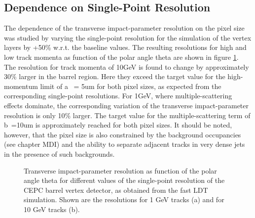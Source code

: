 \subsection{Dependence on Single-Point Resolution}

The dependence of the transverse impact-parameter resolution on the pixel size was studied by varying the single-point resolution for the simulation of the vertex layers by +50\% w.r.t. the baseline values. The resulting resolutions for high and low track momenta as function of the polar angle theta are shown in figure \ref{fig:res}. The resolution for track momenta of 10GeV is found to change by approximately 30\% larger in the barrel region. Here they exceed the target value for the high-momentum limit of a ~= 5um for both pixel sizes, as expected from the corresponding single-point resolutions. For 1GeV, where multiple-scattering effects dominate, the corresponding variation of the transverse impact-parameter resolution is only 10\% larger. The target value for the multiple-scattering term of b~=10um is approximately reached for both pixel sizes. It should be noted, however, that the pixel size is also constrained by the background occupancies (see chapter MDI) and the ability to separate adjacent tracks in very dense jets in the presence of such backgrounds.
\begin{figure}[h!]
	\centering
	\caption{Transverse impact-parameter resolution as function of the polar angle theta for different values of the single-point resolution of the CEPC barrel vertex detector, as obtained from the fast LDT simulation. Shown are the resolutions for 1 GeV tracks (a) and for 10 GeV tracks (b).}
	\label{fig:res}
\end{figure}

